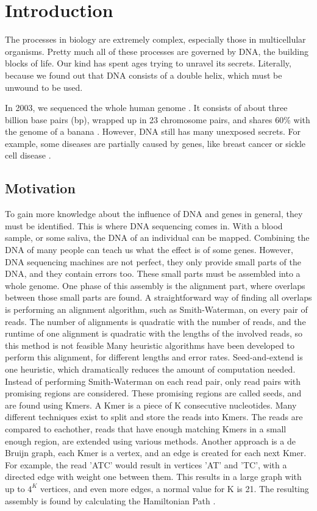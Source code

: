 \documentclass[../thesis.tex]{subfiles}
\begin{document}
\chapter{Introduction}
\ifdefined\main
\else

\fi

The processes in biology are extremely complex, especially those in multicellular organisms.
Pretty much all of these processes are governed by DNA, the building blocks of life.
Our kind has spent ages trying to unravel its secrets.
Literally, because we found out that DNA consists of a double helix, which must be unwound to be used.

In 2003, we sequenced the whole human genome \cite{human_genome_project}.
It consists of about three billion base pairs (bp), wrapped up in 23 chromosome pairs, and shares 60\% with the genome of a banana \cite{banana}.
However, DNA still has many unexposed secrets.
For example, some diseases are partially caused by genes, like breast cancer or sickle cell disease \cite{genomic_diseases}.

\section{Motivation}
To gain more knowledge about the influence of DNA and genes in general, they must be identified.
This is where DNA sequencing comes in.
With a blood sample, or some saliva, the DNA of an individual can be mapped.
Combining the DNA of many people can teach us what the effect is of some genes.
However, DNA sequencing machines are not perfect, they only provide small parts of the DNA, and they contain errors too.
These small parts must be assembled into a whole genome.
One phase of this assembly is the alignment part, where overlaps between those small parts are found.
A straightforward way of finding all overlaps is performing an alignment algorithm, such as Smith-Waterman, on every pair of reads.
The number of alignments is quadratic with the number of reads, and the runtime of one alignment is quadratic with the lengths of the involved reads, so this method is not feasible
Many heuristic algorithms have been developed to perform this alignment, for different lengths and error rates.
Seed-and-extend is one heuristic, which dramatically reduces the amount of computation needed.
Instead of performing Smith-Waterman on each read pair, only read pairs with promising regions are considered.
These promising regions are called seeds, and are found using Kmers.
A Kmer is a piece of K consecutive nucleotides.
Many different techniques exist to split and store the reads into Kmers.
The reads are compared to eachother, reads that have enough matching Kmers in a small enough region, are extended using various methods.
Another approach is a de Bruijn graph, each Kmer is a vertex, and an edge is created for each next Kmer.
For example, the read 'ATC' would result in vertices 'AT' and 'TC', with a directed edge with weight one between them.
This results in a large graph with up to $4^K$ vertices, and even more edges, a normal value for K is 21.
The resulting assembly is found by calculating the Hamiltonian Path \cite{Euler_Hamil_paths}.
\end{document}

